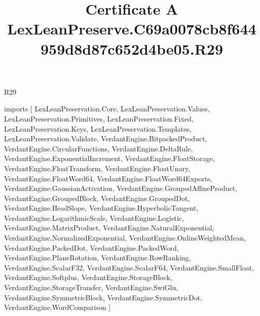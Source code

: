 \begin{lexlean}{R29}
\title{Certificate A LexLeanPreserve.C69a0078cb8f644959d8d87c652d4be05.R29}
\begin{coremodule}
imports [
  LexLeanPreservation.Core,
  LexLeanPreservation.Values,
  LexLeanPreservation.Primitives,
  LexLeanPreservation.Fixed,
  LexLeanPreservation.Keys,
  LexLeanPreservation.Templates,
  LexLeanPreservation.Validate,
  VerdantEngine.BitpackedProduct,
  VerdantEngine.CircularFunctions,
  VerdantEngine.DeltaRule,
  VerdantEngine.ExponentialIncrement,
  VerdantEngine.FloatStorage,
  VerdantEngine.FloatTransform,
  VerdantEngine.FloatUnary,
  VerdantEngine.FloatWord64,
  VerdantEngine.FloatWord64Exports,
  VerdantEngine.GaussianActivation,
  VerdantEngine.GroupedAffineProduct,
  VerdantEngine.GroupedBlock,
  VerdantEngine.GroupedDot,
  VerdantEngine.HeadSlope,
  VerdantEngine.HyperbolicTangent,
  VerdantEngine.LogarithmicScale,
  VerdantEngine.Logistic,
  VerdantEngine.MatrixProduct,
  VerdantEngine.NaturalExponential,
  VerdantEngine.NormalizedExponential,
  VerdantEngine.OnlineWeightedMean,
  VerdantEngine.PackedDot,
  VerdantEngine.PackedWord,
  VerdantEngine.PlaneRotation,
  VerdantEngine.RowRanking,
  VerdantEngine.ScalarF32,
  VerdantEngine.ScalarF64,
  VerdantEngine.SmallFloat,
  VerdantEngine.Softplus,
  VerdantEngine.StorageBlock,
  VerdantEngine.StorageTransfer,
  VerdantEngine.SwiGlu,
  VerdantEngine.SymmetricBlock,
  VerdantEngine.SymmetricDot,
  VerdantEngine.WordComparison
]


\end{coremodule}
\end{lexlean}
